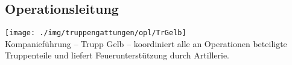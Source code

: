 \subsection{Operationsleitung}
\texttt{[image: ./img/truppengattungen/opl/TrGelb]}\\
Kompanieführung -- Trupp Gelb -- koordiniert alle an Operationen beteiligte Truppenteile und liefert Feuerunterstützung durch Artillerie.